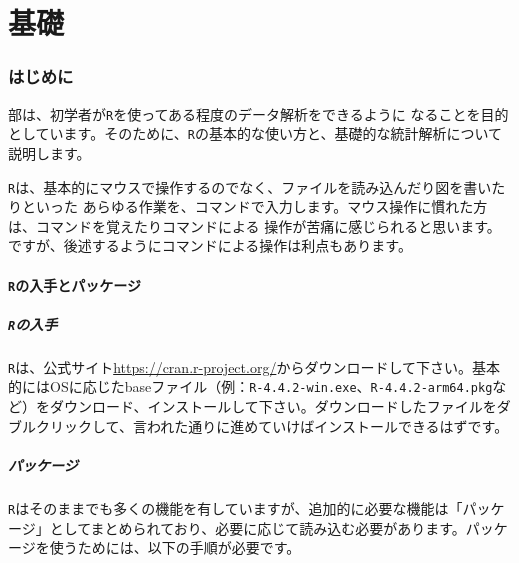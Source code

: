 %


\part{基礎}
\label{basic}
\section{はじめに}
\ref{basic}部は、初学者が\texttt{R}を使ってある程度のデータ解析をできるように
なることを目的としています。そのために、\texttt{R}の基本的な使い方と、基礎的な統計解析について説明します。

\texttt{R}は、基本的にマウスで操作するのでなく、ファイルを読み込んだり図を書いたりといった
あらゆる作業を、コマンドで入力します。マウス操作に慣れた方は、コマンドを覚えたりコマンドによる
操作が苦痛に感じられると思います。ですが、後述するようにコマンドによる操作は利点もあります。

  \subsection{\texttt{R}の入手とパッケージ}
    \subsubsection{\texttt{R}の入手}
\texttt{R}は、公式サイト\url{https://cran.r-project.org/}からダウンロードして下さい。基本的にはOSに応じたbaseファイル（例：\verb|R-4.4.2-win.exe|、\verb|R-4.4.2-arm64.pkg|など）をダウンロード、インストールして下さい。ダウンロードしたファイルをダブルクリックして、言われた通りに進めていけばインストールできるはずです。

    \subsubsection{パッケージ}
\texttt{R}はそのままでも多くの機能を有していますが、追加的に必要な機能は「パッケージ」としてまとめられており、必要に応じて読み込む必要があります。パッケージを使うためには、以下の手順が必要です。

